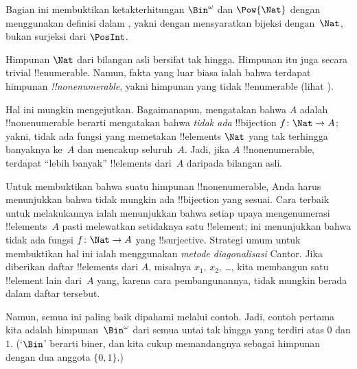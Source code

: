 \documentclass[../../../include/open-logic-section]{subfiles}
\begin{document}


\begin{editorial}
  Bagian ini membuktikan ketakterhitungan $\Bin^\omega$ dan $\Pow{\Nat}$
  dengan menggunakan definisi dalam , yakni dengan
  mensyaratkan bijeksi dengan~$\Nat$, bukan surjeksi dari $\PosInt$.
\end{editorial}

\begin{explain}
Himpunan $\Nat$ dari bilangan asli bersifat tak hingga. Himpunan itu juga
secara trivial !!{enumerable}. Namun, fakta yang luar biasa ialah bahwa
terdapat himpunan \emph{!!{nonenumerable}}, yakni himpunan yang tidak
!!{enumerable} (lihat ).

Hal ini mungkin mengejutkan. Bagaimanapun, mengatakan bahwa $A$ adalah
!!{nonenumerable} berarti mengatakan bahwa \emph{tidak ada} !!{bijection} $f
\colon \Nat \to A$; yakni, tidak ada fungsi yang memetakan !!{element}s
$\Nat$ yang tak terhingga banyaknya ke~$A$ dan mencakup seluruh~$A$. Jadi,
jika $A$ !!{nonenumerable}, terdapat ``lebih banyak'' !!{element}s dari~$A$
daripada bilangan asli.

Untuk membuktikan bahwa suatu himpunan !!{nonenumerable}, Anda harus
menunjukkan bahwa tidak mungkin ada !!{bijection} yang sesuai. Cara terbaik
untuk melakukannya ialah menunjukkan bahwa setiap upaya mengenumerasi
!!{element}s~$A$ pasti melewatkan setidaknya satu !!{element}; ini menunjukkan
bahwa tidak ada fungsi $f\colon \Nat \to A$ yang !!{surjective}. Strategi umum
untuk membuktikan hal ini ialah menggunakan \emph{metode diagonalisasi} Cantor.
Jika diberikan daftar !!{element}s dari $A$, misalnya $x_1$, $x_2$, \dots,
kita membangun satu !!{element} lain dari~$A$ yang, karena cara pembangunannya,
tidak mungkin berada dalam daftar tersebut.

Namun, semua ini paling baik dipahami melalui contoh. Jadi, contoh pertama
kita adalah himpunan~$\Bin^\omega$ dari semua untai tak hingga yang terdiri
atas $0$ dan $1$. (`$\Bin$' berarti biner, dan kita cukup memandangnya sebagai
himpunan dengan dua anggota $\{0,1\}$.)
\end{explain}
\end{document}
